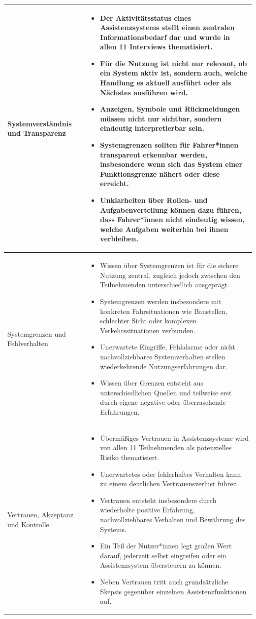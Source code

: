 {\begin{xltabular}{\textwidth}{
    |P{0.24\textwidth}
    |Y|
}
Systemverständnis und Transparenz &
\begin{itemize}[leftmargin=*,nosep]
    \item Der Aktivitätsstatus eines Assistenzsystems stellt einen zentralen Informationsbedarf dar und wurde in allen 11 Interviews thematisiert.
    \item Für die Nutzung ist nicht nur relevant, ob ein System aktiv ist, sondern auch, welche Handlung es aktuell ausführt oder als Nächstes ausführen wird.
    \item Anzeigen, Symbole und Rückmeldungen müssen nicht nur sichtbar, sondern eindeutig interpretierbar sein.
    \item Systemgrenzen sollten für Fahrer*innen transparent erkennbar werden, insbesondere wenn sich das System einer Funktionsgrenze nähert oder diese erreicht.
    \item Unklarheiten über Rollen- und Aufgabenverteilung können dazu führen, dass Fahrer*innen nicht eindeutig wissen, welche Aufgaben weiterhin bei ihnen verbleiben.
\end{itemize}
\\
\hline

Systemgrenzen und Fehlverhalten &
\begin{itemize}[leftmargin=*,nosep]
    \item Wissen über Systemgrenzen ist für die sichere Nutzung zentral, zugleich jedoch zwischen den Teilnehmenden unterschiedlich ausgeprägt.
    \item Systemgrenzen werden insbesondere mit konkreten Fahrsituationen wie Baustellen, schlechter Sicht oder komplexen Verkehrssituationen verbunden.
    \item Unerwartete Eingriffe, Fehlalarme oder nicht nachvollziehbares Systemverhalten stellen wiederkehrende Nutzungserfahrungen dar.
    \item Wissen über Grenzen entsteht aus unterschiedlichen Quellen und teilweise erst durch eigene negative oder überraschende Erfahrungen.
\end{itemize}
\\
\hline

Vertrauen, Akzeptanz und Kontrolle &
\begin{itemize}[leftmargin=*,nosep]
    \item Übermäßiges Vertrauen in Assistenzsysteme wird von allen 11 Teilnehmenden als potenzielles Risiko thematisiert.
    \item Unerwartetes oder fehlerhaftes Verhalten kann zu einem deutlichen Vertrauensverlust führen.
    \item Vertrauen entsteht insbesondere durch wiederholte positive Erfahrung, nachvollziehbares Verhalten und Bewährung des Systems.
    \item Ein Teil der Nutzer*innen legt großen Wert darauf, jederzeit selbst eingreifen oder ein Assistenzsystem übersteuern zu können.
    \item Neben Vertrauen tritt auch grundsätzliche Skepsis gegenüber einzelnen Assistenzfunktionen auf.
\end{itemize}
\\
\hline


\end{xltabular}}
